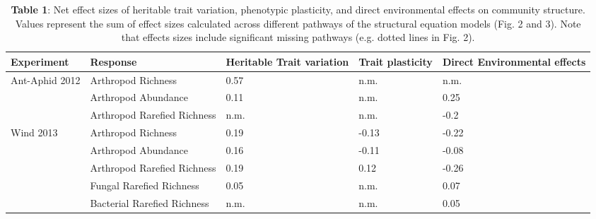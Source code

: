 \begin{table}[]
\centering
\caption{\textbf{Table 1}: Net effect sizes of heritable trait variation, phenotypic plasticity, and direct environmental effects on community structure. Values represent the sum of effect sizes calculated across different pathways of the structural equation models (Fig. 2 and 3). Note that effects sizes include significant missing pathways (e.g. dotted lines in Fig. 2).}
\label{my-l}
\begin{tabular}{@{}lllll@{}}
\toprule
Experiment                      & Response                    & Heritable Trait variation & Trait plasticity & Direct Environmental effects \\ \midrule
\multirow{3}{*}{Ant-Aphid 2012} & Arthropod Richness          & 0.57                      & n.m.             & n.m.                         \\
                                & Arthropod Abundance         & 0.11                      & n.m.             & 0.25                         \\
                                & Arthropod Rarefied Richness & n.m.                      & n.m.             & -0.2                         \\
\multirow{5}{*}{Wind 2013}      & Arthropod Richness          & 0.19                      & -0.13            & -0.22                        \\
                                & Arthropod Abundance         & 0.16                      & -0.11            & -0.08                        \\
                                & Arthropod Rarefied Richness & 0.19                      & 0.12             & -0.26                        \\
                                & Fungal Rarefied Richness    & 0.05                      & n.m.             & 0.07                         \\
                                & Bacterial Rarefied Richness & n.m.                      & n.m.             & 0.05                         \\ \cmidrule(l){2-5} 
\end{tabular}
\end{table}